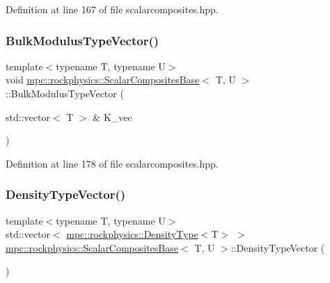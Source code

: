 Definition at line 167 of file scalarcomposites.\+hpp.

\mbox{\label{classmpc_1_1rockphysics_1_1_scalar_composites_base_a8b2c81765221042743e393e3a02153f3}} 
\subsubsection{\texorpdfstring{Bulk\+Modulus\+Type\+Vector()}{BulkModulusTypeVector()}\hspace{0.1cm}{\footnotesize\ttfamily [3/3]}}
{\footnotesize\ttfamily template$<$typename T, typename U$>$ \\
void \mbox{\hyperlink{classmpc_1_1rockphysics_1_1_scalar_composites_base}{mpc\+::rockphysics\+::\+Scalar\+Composites\+Base}}$<$ T, U $>$\+::Bulk\+Modulus\+Type\+Vector (\begin{DoxyParamCaption}\item[{std\+::vector$<$ T $>$ \&}]{K\+\_\+vec }\end{DoxyParamCaption})\hspace{0.3cm}{\ttfamily [inline]}}



Definition at line 178 of file scalarcomposites.\+hpp.

\mbox{\label{classmpc_1_1rockphysics_1_1_scalar_composites_base_a93d459f2440b68c970864abd93e3934a}} 
\subsubsection{\texorpdfstring{Density\+Type\+Vector()}{DensityTypeVector()}\hspace{0.1cm}{\footnotesize\ttfamily [1/3]}}
{\footnotesize\ttfamily template$<$typename T, typename U$>$ \\
std\+::vector$<$ \mbox{\hyperlink{structmpc_1_1rockphysics_1_1_density_type}{mpc\+::rockphysics\+::\+Density\+Type}}$<$T$>$ $>$ \mbox{\hyperlink{classmpc_1_1rockphysics_1_1_scalar_composites_base}{mpc\+::rockphysics\+::\+Scalar\+Composites\+Base}}$<$ T, U $>$\+::Density\+Type\+Vector (\begin{DoxyParamCaption}{ }\end{DoxyParamCaption})\hspace{0.3cm}{\ttfamily [inline]}}



